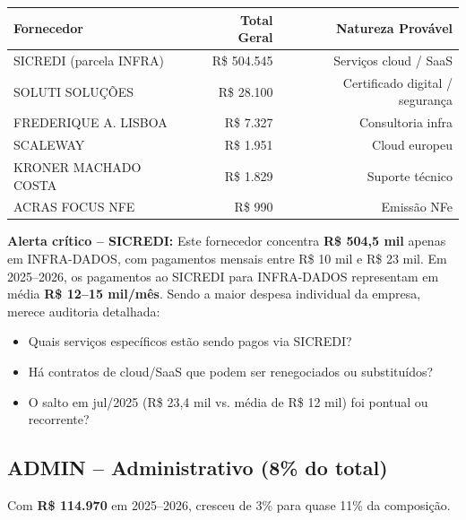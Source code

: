\documentclass[12pt, a4paper]{article}
\newcommand{\reais}[1]{R\$ #1}
\begin{document}
\begin{table}[H]
    \centering
    \small
    \renewcommand{\arraystretch}{1.3}
    \begin{tabularx}{\textwidth}{X r r}
        \toprule
        \rowcolor{tableHeader} \textbf{Fornecedor} & \textbf{Total Geral} & \textbf{Natureza Provável} \\
        \midrule
        \rowcolor{accentColor!10} SICREDI (parcela INFRA) & \reais{504.545} & Serviços cloud / SaaS \\
        SOLUTI SOLUÇÕES & \reais{28.100} & Certificado digital / segurança \\
        FREDERIQUE A. LISBOA & \reais{7.327} & Consultoria infra \\
        SCALEWAY & \reais{1.951} & Cloud europeu \\
        KRONER MACHADO COSTA & \reais{1.829} & Suporte técnico \\
        ACRAS FOCUS NFE & \reais{990} & Emissão NFe \\
        \bottomrule
    \end{tabularx}
\end{table}

\textcolor{alertRed}{\textbf{Alerta crítico -- SICREDI:}} Este fornecedor concentra \textbf{R\$ 504,5 mil} apenas em INFRA-DADOS, com pagamentos mensais entre R\$ 10 mil e R\$ 23 mil. Em 2025--2026, os pagamentos ao SICREDI para INFRA-DADOS representam em média \textbf{R\$ 12--15 mil/mês}. Sendo a maior despesa individual da empresa, merece auditoria detalhada:

\begin{itemize}[nosep]
    \item Quais serviços específicos estão sendo pagos via SICREDI?
    \item Há contratos de cloud/SaaS que podem ser renegociados ou substituídos?
    \item O salto em jul/2025 (R\$ 23,4 mil vs. média de R\$ 12 mil) foi pontual ou recorrente?
\end{itemize}

\subsection{ADMIN -- Administrativo (8\% do total)}

Com \textbf{R\$ 114.970} em 2025--2026, cresceu de 3\% para quase 11\% da composição.
\end{document}
